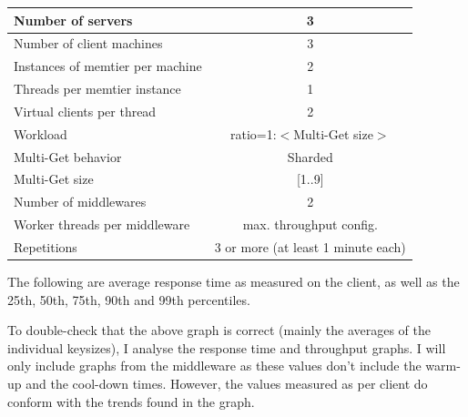 \documentclass[11pt,a4paper]{article}
\begin{document}
\begin{center}
	\scriptsize{
		\begin{tabular}{|l|c|}
			\hline Number of servers                & 3                       \\ 
			\hline Number of client machines        & 3                       \\ 
			\hline Instances of memtier per machine & 2                       \\ 
			\hline Threads per memtier instance     & 1                       \\
			\hline Virtual clients per thread       & 2     		            \\ 
			\hline Workload                         & ratio=1:$<$Multi-Get size$>$             \\
			\hline Multi-Get behavior               & Sharded                 \\
			\hline Multi-Get size                   & [1..9]                  \\
			\hline Number of middlewares            & 2                       \\
			\hline Worker threads per middleware    & max. throughput config. \\
			\hline Repetitions                      & 3 or more (at least 1 minute each)               \\ 
			\hline 
		\end{tabular}
	} 
\end{center}

The following are average response time as measured on the client, as well as the 25th, 50th, 75th, 90th and 99th percentiles.

To double-check that the above graph is correct (mainly the averages of the individual keysizes), I analyse the response time and throughput graphs.
I will only include graphs from the middleware as these values don't include the warm-up and the cool-down times.
However, the values measured as per client do conform with the trends found in the graph. 
\end{document}

